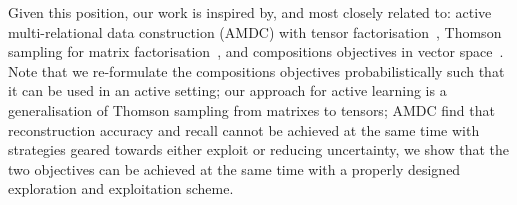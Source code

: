 Given this position, our work is inspired by, and most closely related to:
active multi-relational data construction (AMDC) 
with tensor factorisation~\cite{kajino2015active}, 
Thomson sampling for matrix factorisation~\cite{kawale2015efficient}, 
and compositions objectives in vector space~\cite{guu2015traversing}.
Note that we re-formulate the compositions objectives probabilistically such that it can be used in an active setting; 
our approach for active learning is a generalisation of
Thomson sampling from matrixes to tensors; 
AMDC find that reconstruction accuracy and recall 
cannot be achieved at the same time with strategies geared towards 
either exploit or reducing uncertainty, 
we show that the two objectives can be achieved at the same time with 
a properly designed exploration and exploitation scheme. 



%

